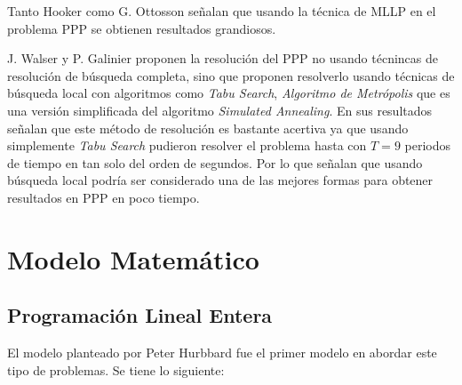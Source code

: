 \documentclass[letter, 10pt]{article}
\begin{document}
Tanto Hooker\cite{Hooker1999395} como G. Ottosson\cite{ottosson1999integration} señalan que usando la técnica de MLLP en el problema PPP se obtienen resultados grandiosos.

J. Walser \cite{Walser:1997:SLP:1867406.1867448} y P. Galinier\cite{Galinier1999} proponen la resolución del PPP no usando técnincas de resolución de búsqueda completa, sino que proponen resolverlo usando técnicas de búsqueda local con algoritmos como \textit{Tabu Search}, \textit{Algoritmo de Metrópolis} que es una versión simplificada del algoritmo \textit{Simulated Annealing}\cite{Kirkpatrick671}. En sus resultados señalan que este método de resolución es bastante acertiva ya que usando simplemente \textit{Tabu Search} pudieron resolver el problema hasta con $T=9$ periodos de tiempo en tan solo del orden de segundos. Por lo que señalan que usando búsqueda local podría ser considerado una de las mejores formas para obtener resultados en PPP en poco tiempo\cite{Galinier1999}.





\section{Modelo Matemático}

\subsection{Programación Lineal Entera}

El modelo planteado por Peter Hurbbard\cite{Smith1996} fue el primer modelo en abordar este tipo de problemas. Se tiene lo siguiente:
\end{document}
